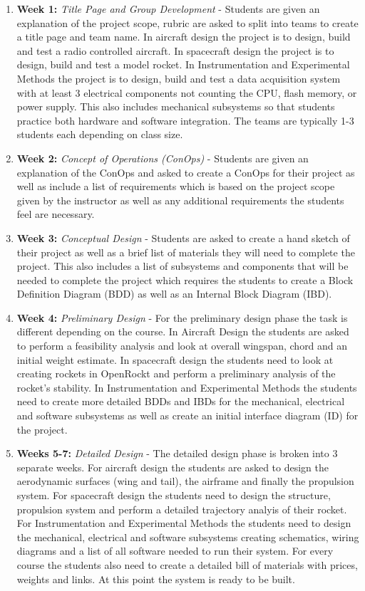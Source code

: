 \begin{enumerate}[itemsep=-5pt]
  \item {\bf Week 1:} {\it Title Page and Group Development} - Students are given an explanation of the project scope, rubric are asked to split into teams to create a title page and team name. In aircraft design the project is to design, build and test a radio controlled aircraft. In spacecraft design the project is to design, build and test a model rocket. In Instrumentation and Experimental Methods the project is to design, build and test a data acquisition system with at least 3 electrical components not counting the CPU, flash memory, or power supply. This also includes mechanical subsystems so that students practice both hardware and software integration. The teams are typically 1-3 students each depending on class size.
  \item {\bf Week 2:} {\it Concept of Operations (ConOps)} - Students are given an explanation of the ConOps and asked to create a ConOps for their project as well as include a list of requirements which is based on the project scope given by the instructor as well as any additional requirements the students feel are necessary.
  \item {\bf Week 3:} {\it Conceptual Design} - Students are asked to create a hand sketch of their project as well as a brief list of materials they will need to complete the project. This also includes a list of subsystems and components that will be needed to complete the project which requires the students to create a Block Definition Diagram (BDD) as well as an Internal Block Diagram (IBD).
  \item {\bf Week 4:} {\it Preliminary Design} - For the preliminary design phase the task is different depending on the course. In Aircraft Design the students are asked to perform a feasibility analysis and look at overall wingspan, chord and an initial weight estimate. In spacecraft design the students need to look at creating rockets in OpenRockt and perform a preliminary analysis of the rocket's stability. In Instrumentation and Experimental Methods the students need to create more detailed BDDs and IBDs for the mechanical, electrical and software subsystems as well as create an initial interface diagram (ID) for the project.
  \item {\bf Weeks 5-7:} {\it Detailed Design} - The detailed design phase is broken into 3 separate weeks. For aircraft design the students are asked to design the aerodynamic surfaces (wing and tail), the airframe and finally the propulsion system. For spacecraft design the students need to design the structure, propulsion system and perform a detailed trajectory analyis of their rocket. For Instrumentation and Experimental Methods the students need to design the mechanical, electrical and software subsystems creating schematics, wiring diagrams and a list of all software needed to run their system. For every course the students also need to create a detailed bill of materials with prices, weights and links. At this point the system is ready to be built.

\end{enumerate}
